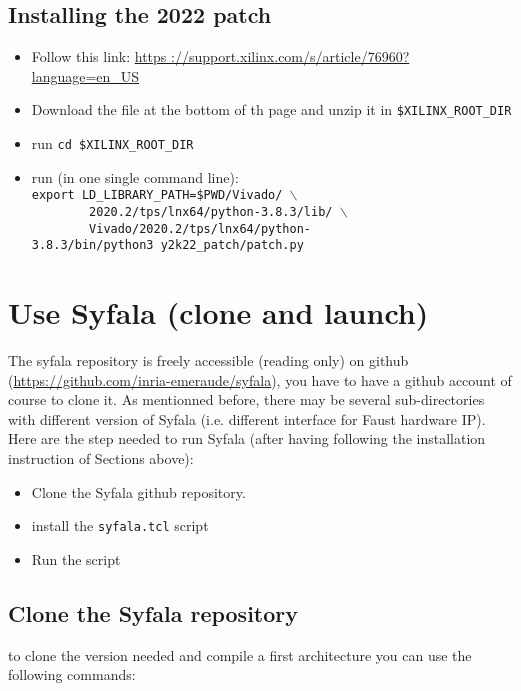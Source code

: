 %
\subsection{Installing the 2022
patch}\label{2k22patch-install}

\begin{itemize}
\item
  Follow this link:
  \href{https://support.xilinx.com/s/article/76960?language=en_US}{https ://support.xilinx.com/s/article/76960?language=en\_US}
\item
  Download the file at the bottom of th page and unzip it in
  \texttt{\$XILINX\_ROOT\_DIR}
\item
  run \texttt{cd\ \$XILINX\_ROOT\_DIR}
\item
  run (in one single command line):\\
  \texttt{export\ LD\_LIBRARY\_PATH=\$PWD/Vivado/ $\backslash$} \\
  \texttt{\ \ \ \ \ \ \ \ 2020.2/tps/lnx64/python-3.8.3/lib/ $\backslash$}\\
  \texttt{\ \ \ \ \ \ \ \ Vivado/2020.2/tps/lnx64/python-3.8.3/bin/python3\ y2k22\_patch/patch.py}
\end{itemize}




\section{Use Syfala (clone and launch)}
\label{sec-syfala}
The syfala repository is freely accessible (reading only) on  github (\url{https://github.com/inria-emeraude/syfala}), you have to have a github account of course to clone it. As mentionned before, there may be several sub-directories with different version of Syfala (i.e. different interface for Faust hardware IP). Here are the step needed to run Syfala (after having following the installation instruction of Sections above):
\begin{itemize}
\item Clone the Syfala github repository.
\item install the {\tt syfala.tcl} script
\item Run the script
\end{itemize}

\subsection{Clone the Syfala repository}
to clone the version needed and compile a first architecture you can use the following commands:\\

